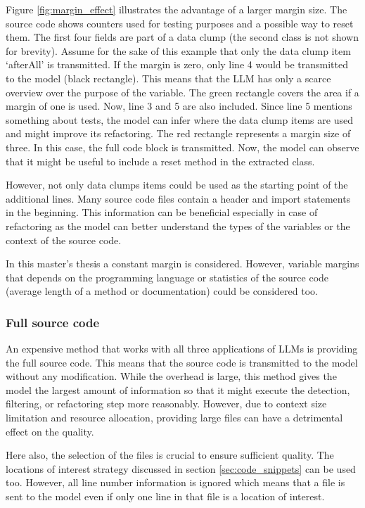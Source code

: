 Figure \ref{fig:margin_effect} illustrates the advantage of a larger margin size. The source code shows counters used for testing purposes and a possible way to reset them. The first four fields are part of a data clump (the second class is not shown for brevity). Assume for the sake of this example that only the data clump item \enquote*{afterAll} is transmitted. If the margin is zero, only line 4 would be transmitted to the model (black rectangle). This means that the \ac{LLM} has only a scarce overview over the purpose of the variable.
The green rectangle covers the area if a margin of one is used. Now, line 3 and 5 are also included. Since line 5 mentions something about tests, the model can infer where the data clump items are used and might improve its refactoring. The red rectangle represents a margin size of three. In this case, the full code block is transmitted. Now, the model can observe that it might be useful to include a reset method in the extracted class. 

However, not only data clumps items could be used as the starting point of the additional lines. Many source code files contain a header and import statements in the beginning. This information can be beneficial especially in case of refactoring as the model can better understand the types of the variables or the context of the source code.

In this master's thesis a constant margin is considered. However, variable margins that depends on the programming language or statistics of the source code (average length of a method or documentation) could be considered too.


\subsubsection{Full source code}

An expensive method that works with all three applications of \acp{LLM} is providing the full source code. This means that the source code is transmitted to the model without any modification. While the overhead is large, this method gives the model the largest amount of information so that it might execute the detection, filtering, or refactoring step more reasonably. However, due to context size limitation and resource allocation, providing large files can have a detrimental  effect on the quality. 

Here also, the selection of the files is crucial to ensure sufficient quality. The locations of interest strategy discussed in section \ref{sec:code_snippets} can be used too. However, all line number information is ignored which means that a file is sent to the model even if only one line in that file is a location of interest. 





